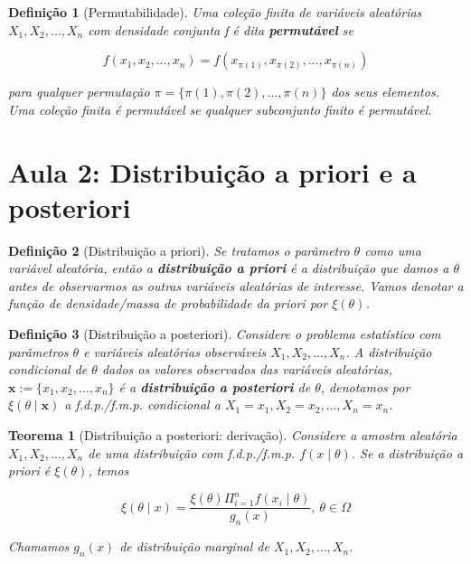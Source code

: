 \documentclass{article}
\newtheorem{theorem}{Teorema}
\newtheorem{definition}{Definição}
\begin{document}
\begin{definition}[Permutabilidade]
Uma coleção finita de variáveis aleatórias $X_1, X_2, \ldots, X_n$ com densidade conjunta f é dita \textbf{permutável} se

\begin{equation}
f(x_1, x_2, \ldots, x_n) = f(x_{\pi(1)}, x_{\pi(2)}, \ldots, x_{\pi(n)})
\end{equation}

para qualquer permutação $\pi = \{\pi(1), \pi(2), \ldots, \pi(n)\}$ dos seus elementos. Uma coleção finita é permutável se qualquer subconjunto finito é permutável.
\end{definition}

\section*{Aula 2:  Distribuição a priori e a posteriori}
\label{s2}
\begin{definition}[Distribuição a priori]
Se tratamos o parâmetro $\theta$ como uma variável aleatória, então a \textbf{distribuição a priori} é a distribuição que damos a $\theta$ antes de observarmos as outras variáveis aleatórias de interesse. Vamos denotar a função de densidade/massa de probabilidade da priori por $\xi(\theta)$.
\end{definition}

\begin{definition}[Distribuição a posteriori]
Considere o problema estatístico com parâmetros $\theta$ e variáveis aleatórias observáveis $X_1, X_2, \ldots, X_n$. A distribuição condicional de $\theta$ dados os valores observados das variáveis aleatórias, $\textbf{x} := \{x_1, x_2, \ldots, x_n\}$ é a \textbf{distribuição a posteriori} de $\theta$, denotamos por $\xi(\theta \mid \textbf{x})$ a f.d.p./f.m.p. condicional a $X_1 = x_1, X_2 = x_2, \ldots, X_n = x_n$.
\end{definition}

\begin{theorem}[Distribuição a posteriori: derivação]
Considere a amostra aleatória $X_1, X_2, \ldots, X_n$ de uma distribuição com f.d.p./f.m.p. $f(x \mid \theta)$. Se a distribuição a priori é $\xi(\theta)$, temos

\begin{equation}
\xi(\theta \mid x) = \frac{\xi(\theta) \Pi_{i = 1}^{n} f(x_i \mid \theta)}{g_n(x)}, \ \theta \in \Omega
\end{equation}

Chamamos $g_n(x)$ de distribuição marginal de $X_1, X_2, \ldots, X_n$.
\end{theorem}
\end{document}
